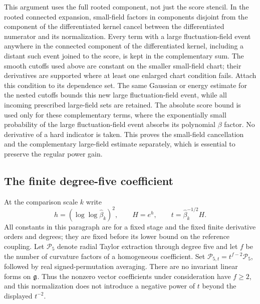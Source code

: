This argument uses the full rooted component, not just the score
stencil. In the rooted connected expansion, small-field factors in
components disjoint from the component of the differentiated kernel cancel
between the differentiated numerator and its normalization. Every term with a large fluctuation-field event anywhere in the connected
component of the differentiated kernel, including a distant such event joined to the score, is kept in the complementary
sum. The smooth cutoffs used above are constant on the smaller small-field
chart; their derivatives are supported where at least one enlarged
chart condition fails. Attach this condition to its dependence set. The same
Gaussian or energy estimate for the nested cutoffs bounds this new
large fluctuation-field event, while all incoming prescribed large-field sets are retained.
The absolute score bound is used only for these complementary terms,
where the exponentially small probability of the large fluctuation-field event absorbs its polynomial
$\beta$ factor. No derivative of a hard indicator is taken. This proves
the small-field cancellation and the complementary large-field estimate
separately, which is essential to preserve the regular power gain.

\subsection{The finite degree-five coefficient}

At the comparison scale $k$ write
\[
 h=(\log\log\widehat\beta_k)^2,\qquad H=e^h,
 \qquad t=\widehat\beta_k^{-1/2}H.
\]
All constants in this paragraph are for a fixed stage and the fixed
finite derivative orders and degrees; they are fixed before its lower bound on the
reference coupling. Let $\mathcal P_5$ denote radial Taylor extraction through
degree five and let $f$ be the number of curvature factors of a homogeneous
coefficient. Set $\mathcal P_{5,t}=t^{f-2}\mathcal P_5$, followed by
real signed-permutation averaging. There are no invariant linear forms on $\mathfrak g$. Thus the nonzero vector coefficients under consideration
have $f\ge2$, and this normalization does not introduce a negative
power of $t$ beyond the displayed $t^{-2}$.

